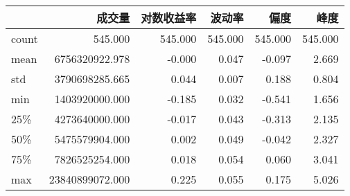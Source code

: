 \begin{tabular}{lrrrrr}
\toprule
{} &             成交量 &   对数收益率 &     波动率 &      偏度 &      峰度 \\
\midrule
count &         545.000 & 545.000 & 545.000 & 545.000 & 545.000 \\
mean  &  6756320922.978 &  -0.000 &   0.047 &  -0.097 &   2.669 \\
std   &  3790698285.665 &   0.044 &   0.007 &   0.188 &   0.804 \\
min   &  1403920000.000 &  -0.185 &   0.032 &  -0.541 &   1.656 \\
25\%   &  4273640000.000 &  -0.017 &   0.043 &  -0.313 &   2.135 \\
50\%   &  5475579904.000 &   0.002 &   0.049 &  -0.042 &   2.327 \\
75\%   &  7826525254.000 &   0.018 &   0.054 &   0.060 &   3.041 \\
max   & 23840899072.000 &   0.225 &   0.055 &   0.175 &   5.026 \\
\bottomrule
\end{tabular}
